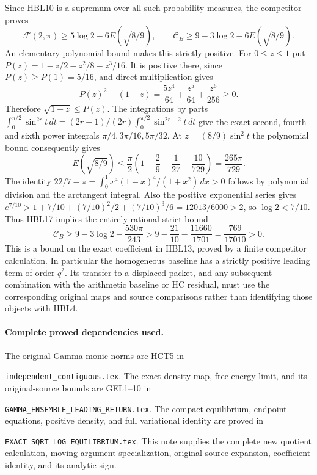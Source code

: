 \documentclass[11pt,a4paper]{article}
\begin{document}
Since HBL10 is a supremum over all such probability measures,
the competitor proves
\[
 \mathcal F(2,\pi)\ge5\log2-6E(\sqrt{8/9}),\qquad
 \mathcal C_B\ge9-3\log2-6E(\sqrt{8/9}).
 \tag{HBL17}
\]
An elementary polynomial bound makes this strictly positive. For
$0\le z\le1$ put $P(z)=1-z/2-z^2/8-z^3/16$. It is positive there,
since $P(z)\ge P(1)=5/16$, and direct multiplication gives
\[
 P(z)^2-(1-z)=\frac{5z^4}{64}+\frac{z^5}{64}+\frac{z^6}{256}\ge0.
\]
Therefore $\sqrt{1-z}\le P(z)$. The integrations by parts
$\int_0^{\pi/2}\sin^{2r}t\,dt=
 (2r-1)/(2r)\int_0^{\pi/2}\sin^{2r-2}t\,dt$ give the exact
second, fourth and sixth power integrals $\pi/4,3\pi/16,5\pi/32$.
At $z=(8/9)\sin^2t$ the polynomial bound consequently gives
\[
 E(\sqrt{8/9})\le\frac\pi2
 \left(1-\frac29-\frac1{27}-\frac{10}{729}\right)
 =\frac{265\pi}{729}.
\]
The identity
$22/7-\pi=\int_0^1x^4(1-x)^4/(1+x^2)\,dx>0$
follows by polynomial division and the arctangent integral.
Also the positive exponential series gives
$e^{7/10}>1+7/10+(7/10)^2/2+(7/10)^3/6=12013/6000>2$,
so $\log2<7/10$. Thus HBL17 implies the entirely rational strict bound
\[
 \boxed{\mathcal C_B\ge9-3\log2-\frac{530\pi}{243}
       >9-\frac{21}{10}-\frac{11660}{1701}
       =\frac{769}{17010}>0.}
 \tag{HBL18}
\]
This is a bound on the exact coefficient in HBL13, proved by a finite
competitor calculation. In particular the homogeneous baseline has a
strictly positive leading term of order $q^2$. Its transfer to a
displaced packet, and any subsequent combination with the arithmetic
baseline or HC residual, must use the corresponding original maps and
source comparisons rather than identifying those objects with HBL4.

\paragraph{Complete proved dependencies used.}
The original Gamma monic norms are HCT5 in
\par\noindent\nolinkurl{independent_contiguous.tex}. The exact density map, free-energy
limit, and its original-source bounds are GEL1--10 in
\par\noindent\nolinkurl{GAMMA_ENSEMBLE_LEADING_RETURN.tex}. The compact equilibrium,
endpoint equations, positive density, and full variational identity are
proved in \par\noindent\nolinkurl{EXACT_SQRT_LOG_EQUILIBRIUM.tex}. This note supplies
the complete new quotient calculation, moving-argument specialization,
original source expansion, coefficient identity, and its analytic sign.
\end{document}
